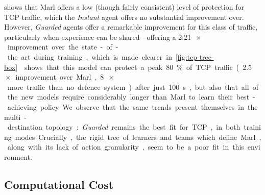 \documentclass[10pt, times, conference, letterpaper]{IEEEtran}
\begin{document}
%	

 shows that Marl offers a low (though fairly consistent) level of protection for TCP traffic, which the \emph{Instant} agent offers no substantial improvement over.
However, \emph{Guarded} agents offer a remarkable improvement for this class of traffic, particularly when experience can be shared---offering a \SI{2.21}{$\!\times$} improvement over the state-of-the art during training, which is made clearer in \cref{fig:tcp-tree-box}.
 shows that this model can protect a peak \SI{80}{\percent} of TCP traffic (\SI{2.5}{$\!\times$} improvement over Marl, \SI{8}{$\!\times$} more traffic than no defence system) after just \SI{100}{\second}, but also that all of the new models require considerably longer than Marl to learn their best-achieving policy.

We observe that the same trends present themselves in the multi-destination topology: \emph{Guarded} remains the best fit for TCP, in both training modes.
Crucially, the rigid tree of learners and teams which define Marl, along with its lack of action granularity, seem to be a poor fit in this environment.


\subsection{Computational Cost}
\end{document}
